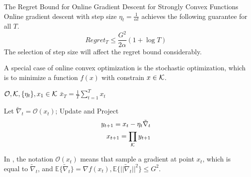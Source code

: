 			\begin{them}{The Regret Bound for Online Gradient Descent for Strongly Convex Functions}{}
				Online gradient descent with step size $\eta_t=\frac{1}{\alpha t}$ achieves the following guarantee for all $T$.
				$$
				Regret_T \le \frac{G^2}{2\alpha}(1+\log T)
				$$
				The selection of step size will affect the regret bound considerably.
			\end{them}
			A special case of online convex optimization is the stochastic optimization, which is to minimize a function $f(x)$ with constrain $x\in\mathcal{K}$.
			\begin{algorithm}[!ht] \label{alg Stochastic Gradient Descent}
				\caption{Stochastic Gradient Descent}
				\begin{algorithmic}[1]
					\Require $\mathcal{O},\mathcal{K},\{\eta_t\},x_1\in\mathcal{K}$
					\Ensure $\bar{x}_T=\frac{1}{T}\sum_{t=1}^T x_t$
					
						\State Let $\tilde{\nabla}_t= \mathcal{O}(x_t)$; 
						\State Update and Project 
						\begin{equation}
							\begin{split}
								y_{t+1} = x_t-\eta_t \tilde{\nabla}_t \\
								x_{t+1} = \prod_{\mathcal{K}} y_{t+1}
							\end{split}
						\end{equation}
					\EndFor
				\end{algorithmic}
			\end{algorithm}
			In , the notation $\mathcal{O}(x_t)$ means that sample a gradient at point $x_t$, which is equal to $\tilde{\nabla}_t$, and $\mathbb{E}\{\tilde{\nabla}_t\}=\nabla f(x_t),\mathbb{E}\{||\tilde{\nabla}_t||^2\}\le G^2$.
